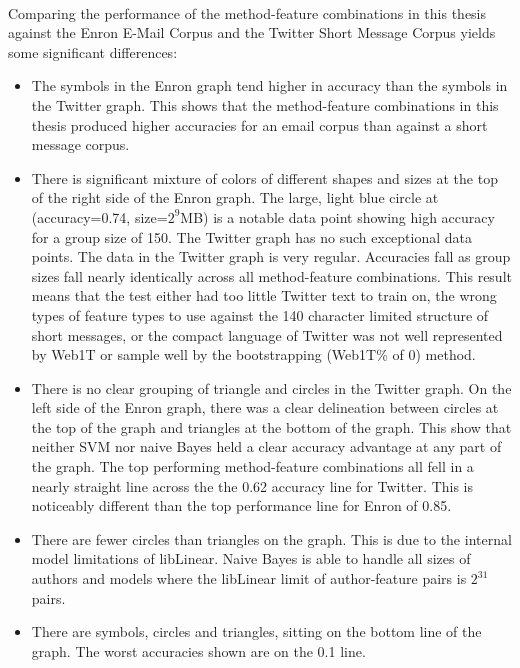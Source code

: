 \paragraph*{} Comparing the performance of the method-feature combinations in this thesis against the Enron E-Mail Corpus and the Twitter Short Message Corpus yields some significant differences:
	\begin{itemize}
		\item The symbols in the Enron graph tend higher in accuracy than the symbols in the Twitter graph.  This shows that the method-feature combinations in this thesis produced higher accuracies for an email corpus than against a short message corpus.
		\item There is significant mixture of colors of different shapes and sizes at the top of the right side of the Enron graph.  The large, light blue circle  at (accuracy=0.74, size=$2^9$MB) is a notable data point showing high accuracy for a group size of 150.  The Twitter graph has no such exceptional data points.  The data in the Twitter graph is very regular.  Accuracies fall as group sizes fall nearly identically across all method-feature combinations.  This result means that the test either had too little Twitter text to train on, the wrong types of feature types to use against the 140 character limited structure of short messages, or the compact language of Twitter was not well represented by Web1T or sample well by the bootstrapping (Web1T\% of 0) method.
		\item There is no clear grouping of triangle and circles in the Twitter graph.  On the left side of the Enron graph, there was a clear delineation between circles at the top of the graph and triangles at the bottom of the graph.  This show that neither SVM nor naive Bayes held a clear accuracy advantage at any part of the graph.  The top performing method-feature combinations all fell in a nearly straight line across the the 0.62 accuracy line for Twitter.  This is noticeably different than the top performance line for Enron of 0.85.


		\item There are fewer circles than triangles on the graph.  This is due to the internal model limitations of libLinear.  Naive Bayes is able to handle all sizes of authors and models where the libLinear limit of author-feature pairs is $2^31$ pairs.
		\item There are symbols, circles and triangles, sitting on the bottom line of the graph.  The worst accuracies shown are on the 0.1 line. 
	\end{itemize}

